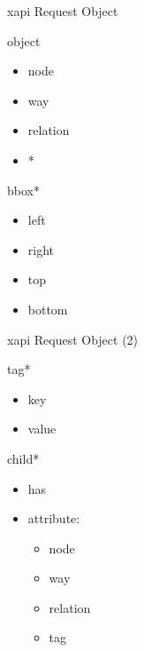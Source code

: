 \documentclass{beamer}
\begin{document}
\begin{frame}{xapi Request Object}

    \begin{block}{object}
        \begin{itemize}
            \item node
            \item way
            \item relation
            \item *
        \end{itemize}
    \end{block}

    \begin{block}{bbox*}
        \begin{itemize}
            \item left
            \item right
            \item top
            \item bottom
        \end{itemize}
    \end{block}

\end{frame}
\begin{frame}{xapi Request Object (2)}
    \begin{block}{tag*}
        \begin{itemize}
            \item key
            \item value
        \end{itemize}
    \end{block}

     \begin{block}{child*}
        \begin{itemize}
            \item has
            \item attribute: 
                \begin{itemize}
                    \item node
                    \item way
                    \item relation
                    \item tag
                \end{itemize}
        \end{itemize}
    \end{block}


\end{frame}
\end{document}
